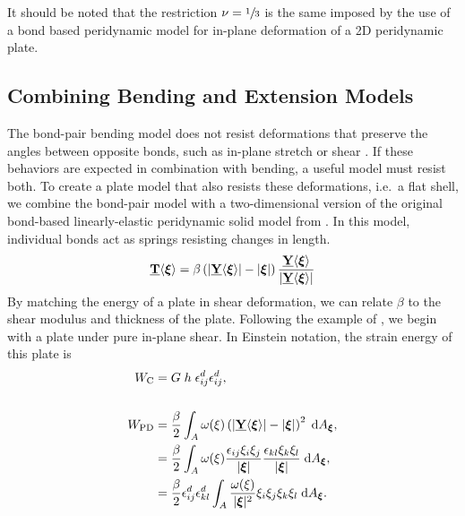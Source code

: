 \documentclass[preprint,review,12pt]{elsarticle}
\newcommand\vstate[3]{%
	\mathbf{\underline{#1}}%
	\ifstrempty{#2}{}{[#2]}%
	\ifstrempty{#3}{}{\langle #3 \rangle}}
\begin{document}
It should be noted that the restriction \(\nu=\sfrac{1}{3}\) is the same imposed by the use of a bond based peridynamic model for in-plane deformation of a 2D peridynamic plate.

\subsection{Combining Bending and Extension Models}
The bond-pair bending model does not resist deformations that preserve the angles between opposite bonds, such as in-plane stretch or shear .  If these behaviors are expected in combination with bending, a useful model must resist both.  To create a plate model that also resists these deformations, i.e.\ a flat shell, we combine the bond-pair model with a two-dimensional version of the original bond-based linearly-elastic peridynamic solid model from \cite{silling2000reformulation}.  In this model, individual bonds act as springs resisting changes in length.
%
\begin{equation}
    \label{eq:bondextension}
    \vstate{T}{}{\boldsymbol{\xi}} =\beta\left(|\vstate{Y}{}{\boldsymbol{\xi}}|-|\boldsymbol{\xi}|\right)\frac{\vstate{Y}{}{\boldsymbol{\xi}}}{|\vstate{Y}{}{\boldsymbol{\xi}}|}
\end{equation}
%
By matching the energy of a plate in shear deformation, we can relate \(\beta\) to the shear modulus and thickness of the plate.  Following the example of \cite{silling2007peridynamic}, we begin with a plate  under pure in-plane shear.  In Einstein notation, the strain energy of this plate is
%
%
\begin{align*}
    W_\text{C} &= G \; h \; \epsilon_{ij}^d \epsilon_{ij}^d,  \\  \\
    W_\text{PD} &= \frac{\beta}{2}\int_A \omega(\xi)\left(|\vstate{Y}{}{\boldsymbol{\xi}}|-|\boldsymbol{\xi}|\right)^2 \; {\rm d}A_{\boldsymbol{\xi}}, \\
    &=\frac{\beta}{2}\int_A  \omega(\xi) \frac{\epsilon_{ij}\xi_i \xi_j }{|\boldsymbol{\xi}|} \frac{\epsilon_{kl} \xi_k \xi_l }{|\boldsymbol{\xi}|}\;{\rm d}A_{\boldsymbol{\xi}},\\
    &=\frac{\beta}{2} \epsilon_{ij}^d \epsilon_{kl}^d \int_A \frac{ \omega(\xi)}{|\boldsymbol{\xi}|^2}\xi_i \xi_j \xi_k \xi_l \;{\rm d}A_{\boldsymbol{\xi}}.
\end{align*}
\end{document}
